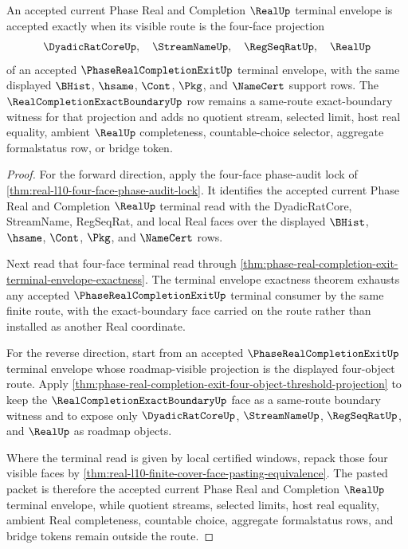 \begin{theorem}
\label{thm:real-current-phase-four-face-terminal-envelope}
An accepted current Phase Real and Completion $\RealUp$ terminal envelope is accepted exactly when its visible route is the four-face projection
$$
\DyadicRatCoreUp,\quad \StreamNameUp,\quad \RegSeqRatUp,\quad \RealUp
$$
of an accepted $\PhaseRealCompletionExitUp$ terminal envelope, with the same displayed $\BHist$, $\hsame$, $\Cont$, $\Pkg$, and $\NameCert$ support rows. The $\RealCompletionExactBoundaryUp$ row remains a same-route exact-boundary witness for that projection and adds no quotient stream, selected limit, host real equality, ambient $\RealUp$ completeness, countable-choice selector, aggregate formalstatus row, or bridge token.
\end{theorem}
\begin{proof}
For the forward direction, apply the four-face phase-audit lock of \autoref{thm:real-l10-four-face-phase-audit-lock}. It identifies the accepted current Phase Real and Completion $\RealUp$ terminal read with the DyadicRatCore, StreamName, RegSeqRat, and local Real faces over the displayed $\BHist$, $\hsame$, $\Cont$, $\Pkg$, and $\NameCert$ rows.

Next read that four-face terminal read through \autoref{thm:phase-real-completion-exit-terminal-envelope-exactness}. The terminal envelope exactness theorem exhausts any accepted $\PhaseRealCompletionExitUp$ terminal consumer by the same finite route, with the exact-boundary face carried on the route rather than installed as another Real coordinate.

For the reverse direction, start from an accepted $\PhaseRealCompletionExitUp$ terminal envelope whose roadmap-visible projection is the displayed four-object route. Apply \autoref{thm:phase-real-completion-exit-four-object-threshold-projection} to keep the $\RealCompletionExactBoundaryUp$ face as a same-route boundary witness and to expose only $\DyadicRatCoreUp$, $\StreamNameUp$, $\RegSeqRatUp$, and $\RealUp$ as roadmap objects.

Where the terminal read is given by local certified windows, repack those four visible faces by \autoref{thm:real-l10-finite-cover-face-pasting-equivalence}. The pasted packet is therefore the accepted current Phase Real and Completion $\RealUp$ terminal envelope, while quotient streams, selected limits, host real equality, ambient Real completeness, countable choice, aggregate formalstatus rows, and bridge tokens remain outside the route.
\end{proof}

